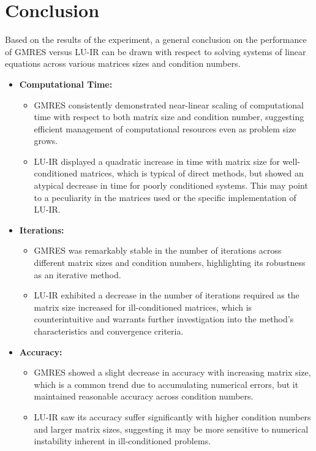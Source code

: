 \section{Conclusion}
Based on the results of the experiment, a general conclusion on the performance of GMRES versus LU-IR can be drawn with respect to solving systems of linear equations across various matrices sizes and condition numbers.\\
\begin{itemize}

    \item \textbf{Computational Time:}
    \begin{itemize}
        \item GMRES consistently demonstrated near-linear scaling of computational time with respect to both matrix size and condition number, suggesting efficient management of computational resources even as problem size grows.
        \item LU-IR displayed a quadratic increase in time with matrix size for well-conditioned matrices, which is typical of direct methods, but showed an atypical decrease in time for poorly conditioned systems. This may point to a peculiarity in the matrices used or the specific implementation of LU-IR.
    \end{itemize}
    \item \textbf{Iterations:}
    \begin{itemize}
        \item GMRES was remarkably stable in the number of iterations across different matrix sizes and condition numbers, highlighting its robustness as an iterative method.
        \item LU-IR exhibited a decrease in the number of iterations required as the matrix size increased for ill-conditioned matrices, which is counterintuitive and warrants further investigation into the method's characteristics and convergence criteria.
    \end{itemize}
    \item \textbf{Accuracy:}
    \begin{itemize}
        \item GMRES showed a slight decrease in accuracy with increasing matrix size, which is a common trend due to accumulating numerical errors, but it maintained reasonable accuracy across condition numbers.
        \item LU-IR saw its accuracy suffer significantly with higher condition numbers and larger matrix sizes, suggesting it may be more sensitive to numerical instability inherent in ill-conditioned problems.

\end{itemize}
\end{itemize}
